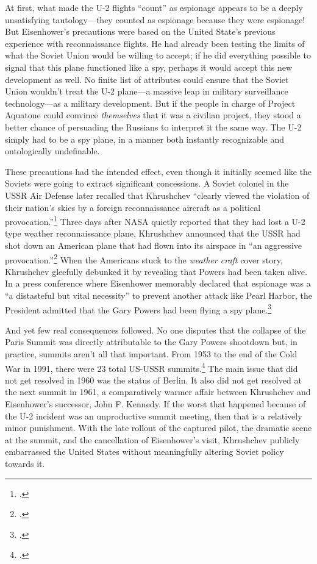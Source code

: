 \documentclass[14pt]{extarticle}
\begin{document}
At first, what made the U-2 flights \enquote{count} as espionage appears to be a deeply unsatisfying tautology---they counted as espionage because they were espionage! But Eisenhower's precautions were based on the United State's previous experience with reconnaissance flights. He had already been testing the limits of what the Soviet Union would be willing to accept; if he did everything possible to signal that this plane functioned like a spy, perhaps it would accept this new development as well. No finite list of attributes could ensure that the Soviet Union wouldn't treat the U-2 plane---a massive leap in military surveillance technology---as a military development. But if the people in charge of Project Aquatone could convince \emph{themselves} that it was a civilian project, they stood a better chance of persuading the Russians to interpret it the same way. The U-2 simply had to be a spy plane, in a manner both instantly recognizable and ontologically undefinable.

These precautions had the intended effect, even though it initially seemed like the Soviets were going to extract significant concessions. A Soviet colonel in the USSR Air Defense later recalled that Khrushchev ``clearly viewed the violation of their nation's skies by a foreign reconnaissance aircraft \textelp{} as a political provocation.''\footcite{orlov_u-2_2007} Three days after NASA quietly reported that they had lost a U-2 type weather reconnaissance plane, Khrushchev announced that the USSR had shot down an American plane that had flown into its airspace in \enquote{an aggressive provocation.}\footcite[p.~112]{powers_operation_2004} When the Americans stuck to the \emph{weather craft} cover story, Khrushchev gleefully debunked it by revealing that Powers had been taken alive. In a press conference where Eisenhower memorably declared that espionage was a \enquote{a distasteful but vital necessity} to prevent another attack like Pearl Harbor, the President admitted that the Gary Powers had been flying a spy plane.\footcite{eisenhower_news_1960}

And yet few real consequences followed. No one disputes that the collapse of the Paris Summit was directly attributable to the Gary Powers shootdown but, in practice, summits aren't all that important. From 1953 to the end of the Cold War in 1991, there were 23 total US-USSR summits.\footcite{fain_chronology_2011} The main issue that did not get resolved in 1960 was the status of Berlin. It also did not get resolved at the next summit in 1961, a comparatively warmer affair between Khrushchev and Eisenhower's successor, John F. Kennedy. If the worst that happened because of the U-2 incident was an unproductive summit meeting, then that is a relatively minor punishment. With the late rollout of the captured pilot, the dramatic scene at the summit, and the cancellation of Eisenhower's visit, Khrushchev publicly embarrassed the United States without meaningfully altering Soviet policy towards it.
\end{document}
